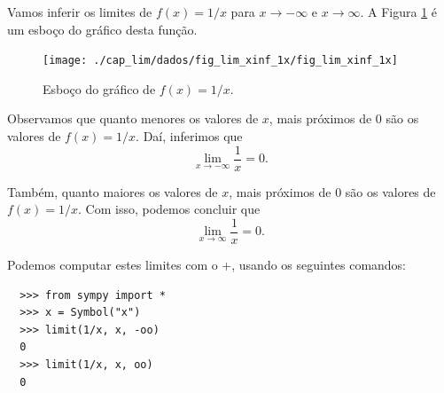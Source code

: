\begin{ex}
  Vamos inferir os limites de $f(x) = 1/x$ para $x\to -\infty$ e $x\to \infty$. A Figura \ref{fig:lim_xinf_1x} é um esboço do gráfico desta função.

\begin{figure}[H]
  \centering
  \texttt{[image: ./cap\_lim/dados/fig\_lim\_xinf\_1x/fig\_lim\_xinf\_1x]}
  \caption{Esboço do gráfico de $f(x) = 1/x$.}
  \label{fig:lim_xinf_1x}
\end{figure}

Observamos que quanto menores os valores de $x$, mais próximos de $0$ são os valores de $f(x)=1/x$. Daí, inferimos que
\begin{equation}
  \lim_{x\to -\infty} \frac{1}{x} = 0.
\end{equation}

Também, quanto maiores os valores de $x$, mais próximos de $0$ são os valores de $f(x)=1/x$. Com isso, podemos concluir que
\begin{equation}
  \lim_{x\to \infty} \frac{1}{x} = 0.
\end{equation}

\ifispython
Podemos computar estes limites com o {\python}+{\sympy}, usando os seguintes comandos:
\begin{lstlisting}
  >>> from sympy import *
  >>> x = Symbol("x")
  >>> limit(1/x, x, -oo)
  0
  >>> limit(1/x, x, oo)
  0
\end{lstlisting}
\fi
\end{ex}

